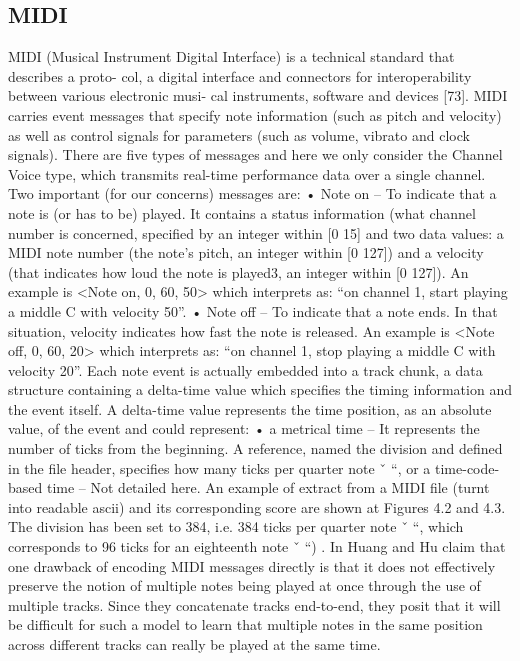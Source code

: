 \subsection{MIDI}

MIDI (Musical Instrument Digital Interface) is a technical standard that describes a proto- col, a digital interface and connectors for interoperability between various electronic musi- cal instruments, software and devices [73]. MIDI carries event messages that specify note information (such as pitch and velocity) as well as control signals for parameters (such as volume, vibrato and clock signals). There are five types of messages and here we only consider the Channel Voice type, which transmits real-time performance data over a single channel. Two important (for our concerns) messages are:
• Note on – To indicate that a note is (or has to be) played. It contains a status information (what channel number is concerned, specified by an integer within [0 15] and two
data values: a MIDI note number (the note’s pitch, an integer within [0 127]) and a velocity (that indicates how loud the note is played3, an integer within [0 127]). An example is <Note on, 0, 60, 50> which interprets as: “on channel 1, start playing a middle C with velocity 50”.
• Note off – To indicate that a note ends. In that situation, velocity indicates how fast the note is released. An example is <Note off, 0, 60, 20> which interprets as: “on
channel 1, stop playing a middle C with velocity 20”.
Each note event is actually embedded into a track chunk, a data structure containing a delta-time value which specifies the timing information and the event itself. A delta-time value represents the time position, as an absolute value, of the event and could represent:
• a metrical time – It represents the number of ticks from the beginning. A reference, named the division and defined in the file header, specifies how many ticks per quarter
note ˇ “, or a time-code-based time – Not detailed here. An example of extract from a MIDI file (turnt into readable ascii) and its corresponding
score are shown at Figures 4.2 and 4.3. The division has been set to 384, i.e. 384 ticks per quarter note ˇ “, which corresponds to 96 ticks for an eighteenth note ˇ “) .
In Huang and Hu claim that one drawback of encoding MIDI messages directly
is that it does not effectively preserve the notion of multiple notes being played at once through the use of multiple tracks. Since they concatenate tracks end-to-end, they posit that it will be difficult for such a model to learn that multiple notes in the same position across different tracks can really be played at the same time.

